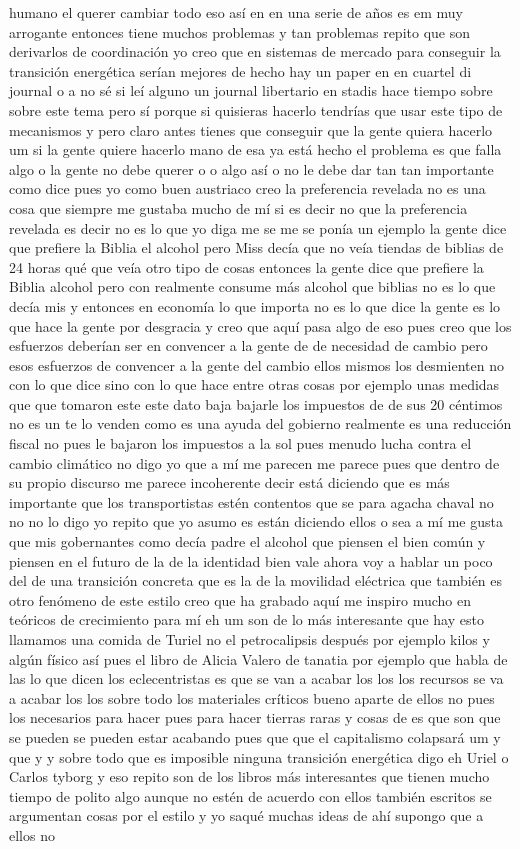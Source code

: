 humano el querer cambiar todo eso así en en una serie de años es em muy arrogante entonces tiene muchos problemas y tan problemas repito que son derivarlos de coordinación yo creo que en sistemas de mercado para conseguir la transición energética serían mejores de hecho hay un paper en en cuartel di journal o a no sé si leí alguno un journal libertario en stadis hace tiempo sobre sobre este tema pero sí porque si quisieras hacerlo tendrías que usar este tipo de mecanismos y pero claro antes tienes que conseguir que la gente quiera hacerlo um si la gente quiere hacerlo mano de esa ya está hecho el problema es que falla algo o la gente no debe querer o o algo así o no le debe dar tan tan importante como dice pues yo como buen austriaco creo la preferencia revelada no es una cosa que siempre me gustaba mucho de mí si es decir no que la preferencia revelada es decir no es lo que yo diga me se me se ponía un ejemplo la gente dice que prefiere la Biblia el alcohol pero Miss decía que no veía tiendas de biblias de 24 horas qué que veía otro tipo de cosas entonces la gente dice que prefiere la Biblia alcohol pero con realmente consume más alcohol que biblias no es lo que decía mis y entonces en economía lo que importa no es lo que dice la gente es lo que hace la gente por desgracia y creo que aquí pasa algo de eso pues creo que los esfuerzos deberían ser en convencer a la gente de de necesidad de cambio pero esos esfuerzos de convencer a la gente del cambio ellos mismos los desmienten no con lo que dice sino con lo que hace entre otras cosas por ejemplo unas medidas que que tomaron este este dato baja bajarle los impuestos de de sus 20 céntimos no es un te lo venden como es una ayuda del gobierno realmente es una reducción fiscal no pues le bajaron los impuestos a la sol pues menudo lucha contra el cambio climático no digo yo que a mí me parecen me parece pues que dentro de su propio discurso me parece incoherente decir está diciendo que es más importante que los transportistas estén contentos que se para agacha chaval no no no lo digo yo repito que yo asumo es están diciendo ellos o sea a mí me gusta que mis gobernantes como decía padre el alcohol que piensen el bien común y piensen en el futuro de la de la identidad bien vale ahora voy a hablar un poco del de una transición concreta que es la de la movilidad eléctrica que también es otro fenómeno de este estilo creo que ha grabado aquí me inspiro mucho en teóricos de crecimiento para mí eh um son de lo más interesante que hay esto llamamos una comida de Turiel no el petrocalipsis después por ejemplo kilos y algún físico así pues el libro de Alicia Valero de tanatia por ejemplo que habla de las lo que dicen los eclecentristas es que se van a acabar los los los recursos se va a acabar los los sobre todo los materiales críticos bueno aparte de ellos no pues los necesarios para hacer pues para hacer tierras raras y cosas de es que son que se pueden se pueden estar acabando pues que que el capitalismo colapsará um y que y y sobre todo que es imposible ninguna transición energética digo eh Uriel o Carlos tyborg y eso repito son de los libros más interesantes que tienen mucho tiempo de polito algo aunque no estén de acuerdo con ellos también escritos se argumentan cosas por el estilo y yo saqué muchas ideas de ahí supongo que a ellos no 